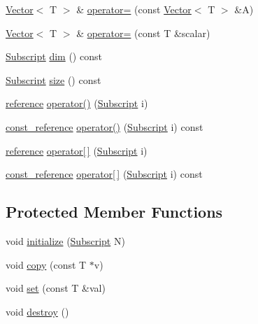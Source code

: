 \begin{DoxyCompactItemize}
\hyperlink{classTNT_1_1Vector}{Vector}$<$ T $>$ \& \hyperlink{classTNT_1_1Vector_ad381a0e422ce8e5a46cc374ee07a8556}{operator=} (const \hyperlink{classTNT_1_1Vector}{Vector}$<$ T $>$ \&A)
\item 
\hyperlink{classTNT_1_1Vector}{Vector}$<$ T $>$ \& \hyperlink{classTNT_1_1Vector_ab4cf6d14d44d75f6b82fcb9178920e11}{operator=} (const T \&scalar)
\item 
\hyperlink{namespaceTNT_af22e3f1460e145c04ce4e7d701e4c1c1}{Subscript} \hyperlink{classTNT_1_1Vector_afa8371d110c5723532594b8a8ae3c1db}{dim} () const 
\item 
\hyperlink{namespaceTNT_af22e3f1460e145c04ce4e7d701e4c1c1}{Subscript} \hyperlink{classTNT_1_1Vector_a222e873d0962fed4c415aeaf18d8431f}{size} () const 
\item 
\hyperlink{classTNT_1_1Vector_a9cdf62749080406bdf3fbace264dac85}{reference} \hyperlink{classTNT_1_1Vector_a3c64911f1a80247c6a973f68d7196038}{operator()} (\hyperlink{namespaceTNT_af22e3f1460e145c04ce4e7d701e4c1c1}{Subscript} i)
\item 
\hyperlink{classTNT_1_1Vector_a2957faed9560f1f53bc5943a160d71bf}{const\-\_\-reference} \hyperlink{classTNT_1_1Vector_acca924ac82897e75fec31e58a163acf2}{operator()} (\hyperlink{namespaceTNT_af22e3f1460e145c04ce4e7d701e4c1c1}{Subscript} i) const 
\item 
\hyperlink{classTNT_1_1Vector_a9cdf62749080406bdf3fbace264dac85}{reference} \hyperlink{classTNT_1_1Vector_ac7fc76b0f4937e37d75f9900fec9c6e1}{operator\mbox{[}$\,$\mbox{]}} (\hyperlink{namespaceTNT_af22e3f1460e145c04ce4e7d701e4c1c1}{Subscript} i)
\item 
\hyperlink{classTNT_1_1Vector_a2957faed9560f1f53bc5943a160d71bf}{const\-\_\-reference} \hyperlink{classTNT_1_1Vector_af11d7d23ebf69b435ed1e7fb45118eb8}{operator\mbox{[}$\,$\mbox{]}} (\hyperlink{namespaceTNT_af22e3f1460e145c04ce4e7d701e4c1c1}{Subscript} i) const 
\end{DoxyCompactItemize}
\subsection*{Protected Member Functions}
\begin{DoxyCompactItemize}
\item 
void \hyperlink{classTNT_1_1Vector_a4f475be0e3634f05a058e5c10b665c62}{initialize} (\hyperlink{namespaceTNT_af22e3f1460e145c04ce4e7d701e4c1c1}{Subscript} N)
\item 
void \hyperlink{classTNT_1_1Vector_a85902585fa9de818133ead8a89b194ac}{copy} (const T $\ast$v)
\item 
void \hyperlink{classTNT_1_1Vector_a6e6f148d1889821389e560ce4a213ac8}{set} (const T \&val)
\item 
void \hyperlink{classTNT_1_1Vector_afb46bf5892eb43cbd0b8cc8f7a126710}{destroy} ()
\end{DoxyCompactItemize}
